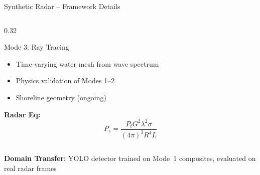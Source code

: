 \documentclass[aspectratio=169, 10pt]{beamer}
\begin{document}
\begin{frame}{Synthetic Radar -- Framework Details}
\begin{columns}[T]
\begin{column}{0.32\textwidth}
\begin{block}{\scriptsize\textcolor{Congaree}{Mode 3: Ray Tracing}}
{\begin{itemize}
          \item Time-varying water mesh from wave spectrum
          \item Physics validation of Modes 1--2
          \item Shoreline geometry (ongoing)
        \end{itemize}
        }
        \vspace{0.1em}
        {\scriptsize\textbf{Radar Eq:}}
        \vspace{-0.3em}
        \[
          P_r = \frac{P_t G^2 \lambda^2 \sigma}{(4\pi)^3 R^4 L}
        \]
      \end{block}
    \end{column}
  \end{columns}
  \vspace{0.2em}
  \centering
  {\footnotesize\textbf{Domain Transfer:} YOLO detector trained on Mode~1 composites, evaluated on real radar frames}
\end{frame}
\end{document}
